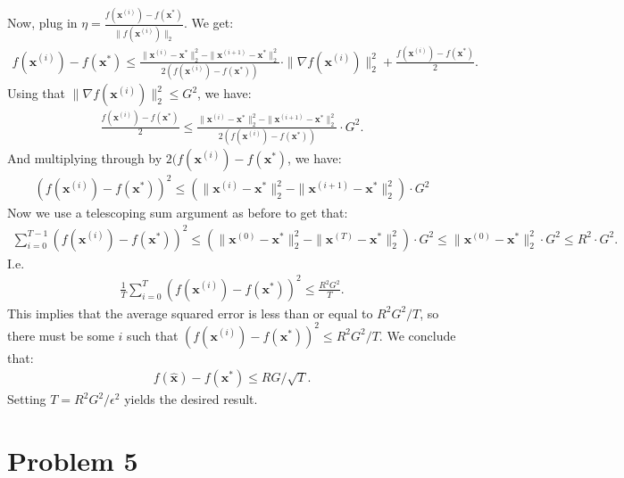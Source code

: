 \documentclass[11pt]{article}
\newcommand{\bv}[1]{\mathbf{#1}}
\begin{document}
Now, plug in $\eta = \frac{f(\bv{x}^{(i)}) - f(\bv{x}^{*})}{\|f(\bv{x}^{(i)})\|_2}$. We get: 
\begin{align*}
	f(\bv{x}^{(i)}) - f(\bv{x}^*) \leq \frac{\|\bv{x}^{(i)} - \bv{x}^*\|_2^2 - \|\bv{x}^{(i+1)} - \bv{x}^*\|_2^2}{2(f(\bv{x}^{(i)}) - f(\bv{x}^*))}\cdot\|\nabla f(\bv{x}^{(i)})\|_2^2 + \frac{f(\bv{x}^{(i)}) - f(\bv{x}^*)}{2}. 
\end{align*}
Using that $\|\nabla f(\bv{x}^{(i)})\|_2^2 \leq G^2$, we have:
\begin{align*}
\frac{f(\bv{x}^{(i)}) - f(\bv{x}^*)}{2}\leq \frac{\|\bv{x}^{(i)} - \bv{x}^*\|_2^2 - \|\bv{x}^{(i+1)} - \bv{x}^*\|_2^2}{2(f(\bv{x}^{(i)}) - f(\bv{x}^*))}\cdot G^2. 
\end{align*}
And multiplying through by $2(f(\bv{x}^{(i)}) - f(\bv{x}^*)$, we have:
\begin{align*}
	(f(\bv{x}^{(i)}) - f(\bv{x}^*))^2 \leq \left(\|\bv{x}^{(i)} - \bv{x}^*\|_2^2 - \|\bv{x}^{(i+1)} - \bv{x}^*\|_2^2\right)\cdot G^2
\end{align*}
Now we use a telescoping sum argument as before to get that:
\begin{align*}
	\sum_{i=0}^{T-1} (f(\bv{x}^{(i)}) - f(\bv{x}^*))^2 \leq \left(\|\bv{x}^{(0)} - \bv{x}^*\|_2^2 - \|\bv{x}^{(T)} - \bv{x}^*\|_2^2\right)\cdot G^2 \leq \|\bv{x}^{(0)} - \bv{x}^*\|_2^2\cdot G^2 \leq R^2\cdot G^2. 
\end{align*}
I.e. 
\begin{align*}
	\frac{1}{T}\sum_{i=0}^{T} (f(\bv{x}^{(i)}) - f(\bv{x}^*))^2 \leq \frac{R^2 G^2}{T}.
\end{align*}
This implies that the average squared error is less than or equal to $R^2G^2/T$, so there must be some $i$ such that $(f(\bv{x}^{(i)}) - f(\bv{x}^*))^2 \leq R^2G^2/T$. We conclude that:
\begin{align*}
	f(\hat{\bv{x}}) - f(\bv{x}^*) \leq RG/\sqrt{T}. 
\end{align*}
Setting $T = R^2G^2/\epsilon^2$ yields the desired result. 


\section*{Problem 5}
\end{document}
